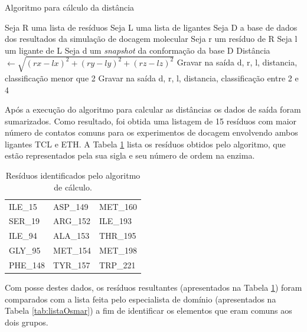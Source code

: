 \begin{itemize}
\begin{algorithm}[H]
\caption{Algoritmo para cálculo da distância}
\label{alg:CalculoDistancia}
{\fontsize{10}{10}\selectfont
\begin{algorithmic}[1]
	\STATE Seja R uma lista de resíduos
	\STATE Seja L uma lista de ligantes
	\STATE Seja D a base de dados dos resultados da simulação de docagem molecular
	\STATE Seja r um resíduo de R
	\STATE Seja l um ligante de L
	\STATE Seja d um \emph{snapshot} da conformação da base D
			\STATE Distância $\gets \sqrt{(rx - lx)^{2} +(ry - ly)^{2} + (rz - lz)^{2}}$ 
			\ENDIF
				\STATE Gravar na saída d, r, l, distancia, classificação menor que 2
				\ELSE
				\STATE Gravar na saída d, r, l, distancia, classificação entre 2 e 4
				\ENDIF
			\ENDIF
			\ENDFOR
		\ENDFOR
	\ENDFOR
\end{algorithmic}
}
\end{algorithm}

% 
%
%       

Após a execução do algoritmo para calcular as distâncias os dados de saída foram sumarizados. Como resultado, foi obtida uma listagem de 15 resíduos com maior número de contatos comuns para os experimentos de docagem envolvendo ambos ligantes TCL e ETH. A Tabela \ref{tab:listaProvavelRelevantes} lista os resíduos obtidos pelo algoritmo, que estão representados pela sua sigla e seu número de ordem na enzima.

\begin{table}[h]
	\caption{Resíduos identificados pelo algoritmo de cálculo.}
	\label{tab:listaProvavelRelevantes}
	\centering
	\begin{tabular}{@{}lll@{}}
	ILE\_15  & ASP\_149 & MET\_160 \\
	SER\_19  & ARG\_152 & ILE\_193 \\
	ILE\_94  & ALA\_153 & THR\_195 \\
	GLY\_95  & MET\_154 & MET\_198 \\
	PHE\_148 & TYR\_157 & TRP\_221 \\
	\end{tabular}
\end{table}

Com posse destes dados, os resíduos resultantes (apresentados na Tabela \ref{tab:listaProvavelRelevantes}) foram comparados com a lista feita pelo especialista de domínio (apresentados na Tabela \ref{tab:listaOsmar}) a fim de identificar os elementos que eram comuns aos dois grupos. 


\end{itemize}
